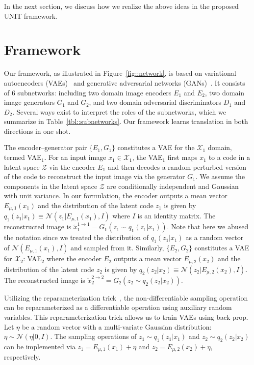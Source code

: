 \documentclass{article}
\begin{document}
In the next section, we discuss how we realize the above ideas in the proposed UNIT framework.

\section{Framework}

Our framework, as illustrated in Figure~\ref{fig::network}, is based on variational autoencoders (VAEs)~\cite{kingma2013auto,rezende2014stochastic,larsen2015autoencoding} and generative adversarial networks (GANs)~\cite{goodfellow2014generative,liu2016coupled}. It consists of 6 subnetworks: including two domain image encoders $E_1$ and $E_2$, two domain image generators $G_1$ and $G_2$, and two domain adversarial discriminators $D_1$ and $D_2$. Several ways exist to interpret the roles of the subnetworks, which we summarize in Table~\ref{tbl::subnetworks}. Our framework learns translation in both directions in one shot. 


 The encoder--generator pair $\{E_1,G_1\}$ constitutes a VAE for the $\mathcal{X}_1$ domain, termed VAE$_{1}$. For an input image $x_1\in \mathcal{X}_1$, the VAE$_{1}$ first maps $x_1$ to a code in a latent space $\mathcal{Z}$ via the encoder $E_1$ and then decodes a random-perturbed version of the code to reconstruct the input image via the generator $G_1$. We assume the components in the latent space $\mathcal{Z}$ are conditionally independent and Gaussian with unit variance. In our formulation, the encoder outputs a mean vector $E_{\mu,1} (x_1)$ and the distribution of the latent code $z_1$ is given by $q_1 (z_1|x_1)\equiv\mathcal{N}(z_1|E_{\mu,1}(x_1),I)$ where $I$ is an identity matrix. The reconstructed image is $\tilde{x}_1^{1\rightarrow 1} =G_1 (z_1 \sim q_1 (z_1|x_1))$. Note that here we abused the notation since we treated the distribution of $q_1 (z_1|x_1)$ as a random vector of $\mathcal{N}(E_{\mu,1}(x_1),I)$ and sampled from it. Similarly, $\{E_2,G_2\}$ constitutes a VAE for $\mathcal{X}_2$: VAE$_2$ where the encoder $E_2$ outputs a mean vector $E_{\mu,2} (x_2)$ and the distribution of the latent code $z_2$ is given by $q_2 (z_2|x_2)\equiv\mathcal{N}(z_2|E_{\mu,2}(x_2),I)$. The reconstructed image is $\tilde{x}_2^{2\rightarrow 2} =G_2 (z_2 \sim q_2 (z_2|x_2))$. 


Utilizing the reparameterization trick~\cite{kingma2013auto}, the non-differentiable sampling operation can be reparameterized as a differentiable operation using auxiliary random variables. This reparameterization trick allows us to train VAEs using back-prop. Let $\eta$ be a random vector with a multi-variate Gaussian distribution: $\eta\sim \mathcal{N}(\eta|0,I)$. The sampling operations of $z_1 \sim q_1 (z_1|x_1)$ and $z_2 \sim q_2 (z_2|x_2)$ can be implemented via $z_1=E_{\mu,1}(x_1) + \eta$ and $z_2=E_{\mu,2}(x_2) + \eta$, respectively.
\end{document}
